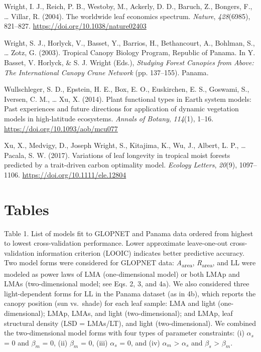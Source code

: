 \documentclass[
  12pt,
  letterpaper,
  DIV=11,
  numbers=noendperiod]{scrartcl}
\newlength{\cslhangindent}
\newlength{\cslentryspacingunit} %
\newenvironment{CSLReferences}[2] %
 {%
  \setlength{\parindent}{0pt}
  \ifodd #1
  \let\oldpar\par
  \def\par{\hangindent=\cslhangindent\oldpar}
  \fi
  \setlength{\parskip}{#2\cslentryspacingunit}
 }%
 {}
\begin{document}
\begin{CSLReferences}{1}{0}
\leavevmode{}%
Wright, I. J., Reich, P. B., Westoby, M., Ackerly, D. D., Baruch, Z.,
Bongers, F., \ldots{} Villar, R. (2004). The worldwide leaf economics
spectrum. \emph{Nature}, \emph{428}(6985), 821--827.
\url{https://doi.org/10.1038/nature02403}

\leavevmode{}%
Wright, S. J., Horlyck, V., Basset, Y., Barrios, H., Bethancourt, A.,
Bohlman, S., \ldots{} Zotz, G. (2003). Tropical {Canopy Biology
Program}, {Republic} of {Panama}. In Y. Basset, V. Horlyck, \& S. J.
Wright (Eds.), \emph{Studying {Forest Canopies} from {Above}: {The
International Canopy Crane Network}} (pp. 137--155). {Panama}.

\leavevmode{}%
Wullschleger, S. D., Epstein, H. E., Box, E. O., Euskirchen, E. S.,
Goswami, S., Iversen, C. M., \ldots{} Xu, X. (2014). Plant functional
types in {Earth} system models: {Past} experiences and future directions
for application of dynamic vegetation models in high-latitude
ecosystems. \emph{Annals of Botany}, \emph{114}(1), 1--16.
\url{https://doi.org/10.1093/aob/mcu077}

\leavevmode{}%
Xu, X., Medvigy, D., Joseph Wright, S., Kitajima, K., Wu, J., Albert, L.
P., \ldots{} Pacala, S. W. (2017). Variations of leaf longevity in
tropical moist forests predicted by a trait-driven carbon optimality
model. \emph{Ecology Letters}, \emph{20}(9), 1097--1106.
\url{https://doi.org/10.1111/ele.12804}

\end{CSLReferences}

\newpage

\hypertarget{tables}{%
\section{Tables}\label{tables}}

Table 1. List of models fit to GLOPNET and Panama data ordered from
highest to lowest cross-validation performance. Lower approximate
leave-one-out cross-validation information criterion (LOOIC) indicates
better predictive accuracy. Two model forms were considered for GLOPNET
data: \emph{A}\textsubscript{area}, \emph{R}\textsubscript{area}, and LL
were modeled as power laws of LMA (one-dimensional model) or both LMAp
and LMAs (two-dimensional model; see Eqs. 2, 3, and 4a). We also
considered three light-dependent forms for LL in the Panama dataset (as
in 4b), which reports the canopy position (sun vs.~shade) for each leaf
sample: LMA and light (one-dimensional); LMAp, LMAs, and light
(two-dimensional); and LMAp, leaf structural density (LSD = LMAs/LT),
and light (two-dimensional). We combined the two-dimensional model forms
with four types of parameter constraints: (i) \(\alpha_s\) = 0 and
\(\beta_m\) = 0, (ii) \(\beta_m\) = 0, (iii) \(\alpha_s\) = 0, and (iv)
\(\alpha_m\) \textgreater{} \(\alpha_s\) and \(\beta_s\) \textgreater{}
\(\beta_m\).
\end{document}
